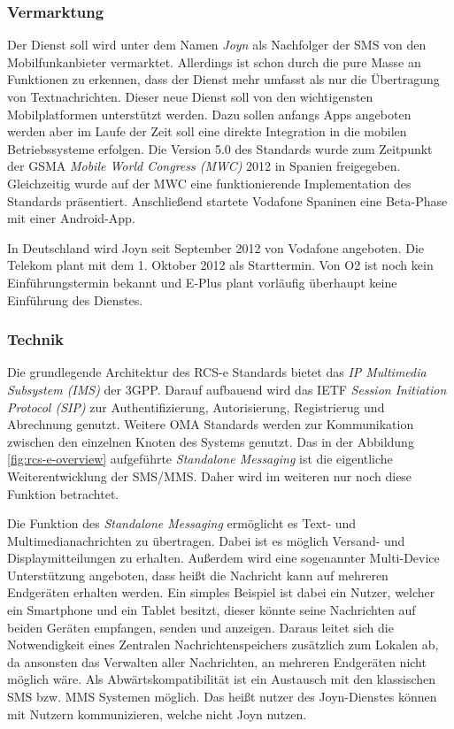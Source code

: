 \documentclass[german,12pt,a4paper]{article}
\begin{document}
  \subsubsection{Vermarktung} %
  \label{ssub:vermarktung}

  Der Dienst soll wird unter dem Namen \textit{Joyn} als \glqq{}Nachfolger der
  SMS\grqq{} von den Mobilfunkanbieter vermarktet. Allerdings ist schon durch die pure Masse an
  Funktionen zu erkennen, dass der Dienst mehr umfasst als nur die
  Übertragung von Textnachrichten. Dieser neue Dienst soll von den wichtigensten
  Mobilplatformen unterstützt werden. Dazu sollen anfangs Apps angeboten werden aber im Laufe der
  Zeit soll eine direkte Integration in die mobilen Betriebssysteme erfolgen. Die Version 5.0
  des Standards wurde zum Zeitpunkt der GSMA \textit{Mobile World
      Congress (MWC)} 2012 in Spanien freigegeben. Gleichzeitig wurde auf der MWC eine
  funktionierende Implementation des Standards präsentiert. Anschließend startete Vodafone Spaninen
  eine Beta-Phase mit einer Android-App.

  In Deutschland wird Joyn seit September 2012 von Vodafone angeboten. Die Telekom plant mit dem
  1. Oktober 2012 als Starttermin. Von O2 ist noch kein Einführungstermin bekannt
  und E-Plus plant vorläufig überhaupt keine Einführung des Dienstes.


  \subsubsection{Technik} %
  \label{ssub:technik}

    Die grundlegende Architektur des RCS-e Standards bietet das \textit{IP Multimedia
        Subsystem (IMS)} der 3GPP. Darauf aufbauend wird das IETF \textit{Session Initiation
        Protocol (SIP)} zur Authentifizierung, Autorisierung, Registrierug und
    Abrechnung genutzt. Weitere OMA Standards werden zur Kommunikation zwischen den einzelnen
    Knoten des Systems genutzt. Das in der Abbildung \ref{fig:rcs-e-overview} aufgeführte
    \textit{Standalone Messaging} ist die eigentliche Weiterentwicklung der SMS/MMS. Daher wird im
    weiteren nur noch diese Funktion betrachtet.

    Die Funktion des \textit{Standalone Messaging} ermöglicht es Text- und Multimedianachrichten
    zu übertragen. Dabei ist es möglich Versand- und Displaymitteilungen zu erhalten. Außerdem wird
    eine sogenannter Multi-Device Unterstützung angeboten, dass heißt die Nachricht kann auf
    mehreren Endgeräten erhalten werden. Ein simples Beispiel ist dabei ein Nutzer, welcher ein
    Smartphone und ein Tablet besitzt, dieser könnte seine Nachrichten auf beiden Geräten
    empfangen, senden und anzeigen. Daraus leitet sich die Notwendigkeit eines Zentralen
    Nachrichtenspeichers zusätzlich zum Lokalen ab, da ansonsten das Verwalten aller
    Nachrichten, an mehreren Endgeräten nicht möglich wäre. Als Abwärtskompatibilität ist
    ein Austausch mit den klassischen SMS bzw. MMS Systemen möglich. Das heißt nutzer des
    Joyn-Dienstes können mit Nutzern kommunizieren, welche nicht Joyn nutzen.
\end{document}
